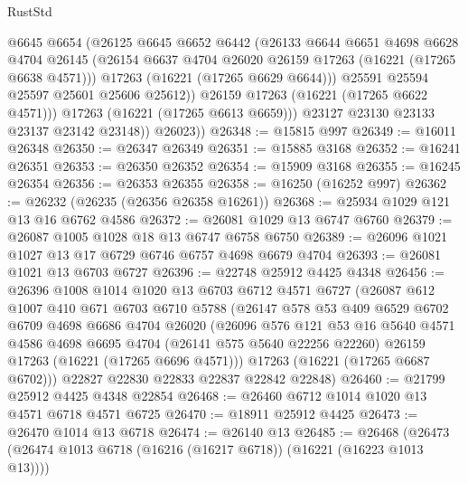 \begin{lexlean}{RustStd}
\begin{coremodule}
                  @6645
                  @6654
                  (@26125
                    @6645
                    @6652
                    @6442
                    (@26133
                      @6644
                      @6651
                      @4698
                      @6628
                      @4704
                      @26145
                      (@26154 @6637 @4704 @26020 @26159 @17263 (@16221 (@17265 @6638 @4571)))
                      @17263
                      (@16221 (@17265 @6629 @6644)))
                    @25591
                    @25594
                    @25597
                    @25601
                    @25606
                    @25612))
                @26159
                @17263
                (@16221 (@17265 @6622 @4571)))
              @17263
              (@16221 (@17265 @6613 @6659)))
            @23127
            @23130
            @23133
            @23137
            @23142
            @23148))
        @26023))
@26348 := @15815 @997
@26349 := @16011 @26348
@26350 := @26347 @26349
@26351 := @15885 @3168
@26352 := @16241 @26351
@26353 := @26350 @26352
@26354 := @15909 @3168
@26355 := @16245 @26354
@26356 := @26353 @26355
@26358 := @16250 (@16252 @997)
@26362 := @26232 (@26235 (@26356 @26358 @16261))
@26368 := @25934 @1029 @121 @13 @16 @6762 @4586
@26372 := @26081 @1029 @13 @6747 @6760
@26379 := @26087 @1005 @1028 @18 @13 @6747 @6758 @6750
@26389 := @26096 @1021 @1027 @13 @17 @6729 @6746 @6757 @4698 @6679 @4704
@26393 := @26081 @1021 @13 @6703 @6727
@26396 := @22748 @25912 @4425 @4348
@26456 := @26396
    @1008
    @1014
    @1020
    @13
    @6703
    @6712
    @4571
    @6727
    (@26087
      @612
      @1007
      @410
      @671
      @6703
      @6710
      @5788
      (@26147
        @578
        @53
        @409
        @6529
        @6702
        @6709
        @4698
        @6686
        @4704
        @26020
        (@26096
          @576
          @121
          @53
          @16
          @5640
          @4571
          @4586
          @4698
          @6695
          @4704
          (@26141 @575 @5640 @22256 @22260)
          @26159
          @17263
          (@16221 (@17265 @6696 @4571)))
        @17263
        (@16221 (@17265 @6687 @6702)))
      @22827
      @22830
      @22833
      @22837
      @22842
      @22848)
@26460 := @21799 @25912 @4425 @4348 @22854
@26468 := @26460 @6712 @1014 @1020 @13 @4571 @6718 @4571 @6725
@26470 := @18911 @25912 @4425
@26473 := @26470 @1014 @13 @6718
@26474 := @26140 @13
@26485 := @26468 (@26473 (@26474 @1013 @6718 (@16216 (@16217 @6718)) (@16221 (@16223 @1013 @13))))

\end{coremodule}
\end{lexlean}
